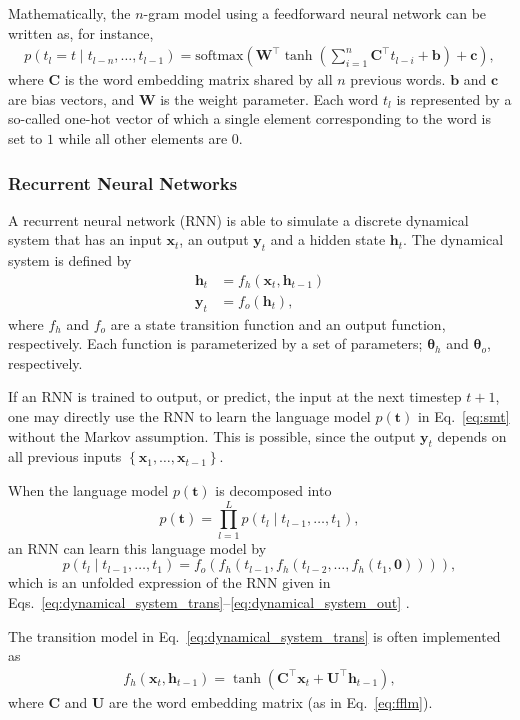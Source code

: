 \documentclass[11pt, oneside]{essay}
\newcommand{\softmax}{\text{softmax}}
\newcommand{\vect}[1]{\mathbf{#1}}
\newcommand{\vects}[1]{\boldsymbol{#1}}
\newcommand{\matr}[1]{\mathbf{#1}}
\newcommand{\vb}[0]{\vect{b}}
\newcommand{\vc}[0]{\vect{c}}
\newcommand{\vh}[0]{\vect{h}}
\newcommand{\vx}[0]{\vect{x}}
\newcommand{\vy}[0]{\vect{y}}
\newcommand{\vt}[0]{\vect{t}}
\newcommand{\mW}[0]{\matr{W}}
\newcommand{\mU}[0]{\matr{U}}
\newcommand{\mC}{\matr{C}}
\newcommand{\vzero}[0]{\vect{0}}
\newcommand{\TT}[0]{{\vects{\theta}}}
\begin{document}
Mathematically, the $n$-gram model using a feedforward neural
network can be written as, for instance, 
\begin{align}
\label{eq:fflm}
    p(t_l =t \mid t_{l-n}, \dots, t_{l-1}) = \softmax
    \left( \mW^\top \tanh\left(\sum_{i=1}^n \mC^\top t_{l-i} +
    \vb\right) +\vc
    \right),
\end{align}
where $\mC$ is the word embedding matrix shared by all $n$
previous words. $\vb$ and $\vc$ are bias vectors, and $\mW$ is
the weight parameter. Each word $t_l$ is represented by a
so-called one-hot vector of which a single element corresponding
to the word is set to $1$ while all other elements are $0$.

\subsubsection{Recurrent Neural Networks}

A recurrent neural network (RNN) is able to simulate a discrete
dynamical system that has an input $\vx_t$, an output $\vy_t$ and
a hidden state $\vh_t$.  The dynamical system is defined by
\begin{align}
    \label{eq:dynamical_system_trans}
    \vh_t &= f_h(\vx_t, \vh_{t-1}) 
    \\
    \label{eq:dynamical_system_out}
    \vy_t &= f_o(\vh_t),
\end{align}
where $f_h$ and $f_o$ are a state transition function and an
output function, respectively. Each function is parameterized by
a set of parameters; $\TT_h$ and $\TT_o$, respectively. 

If an RNN is trained to output, or predict, the input at the next
timestep $t+1$, one may directly use the RNN to learn the
language model $p(\vt)$ in Eq.~\eqref{eq:smt} without the Markov
assumption. This is possible, since the output $\vy_t$ depends on
all previous inputs $\left\{ \vx_1, \dots, \vx_{t-1} \right\}$.

When the language model $p(\vt)$ is decomposed into
\[
    p(\vt) = \prod_{l=1}^L p(t_l \mid t_{l-1}, \dots, t_1),
\]
an RNN can learn this language model by 
\[
    p(t_l \mid t_{l-1}, \dots, t_1) = f_o(f_h(t_{l-1},
    f_h(t_{l-2}, \dots, f_h(t_1, \vzero)))),
\]
which is an unfolded expression of the RNN given in
Eqs.~\eqref{eq:dynamical_system_trans}--\eqref{eq:dynamical_system_out}
\citep{Mikolov2010}.

The transition model in Eq.~\eqref{eq:dynamical_system_trans} is
often implemented as
\begin{align}
\label{eq:rnn_simple_trans}
f_h(\vx_t, \vh_{t-1}) = \tanh\left( \mC^\top \vx_t + \mU^\top
        \vh_{t-1}\right),
\end{align}
where $\mC$ and $\mU$ are the word embedding matrix (as in
Eq.~\eqref{eq:fflm}). 
\end{document}
